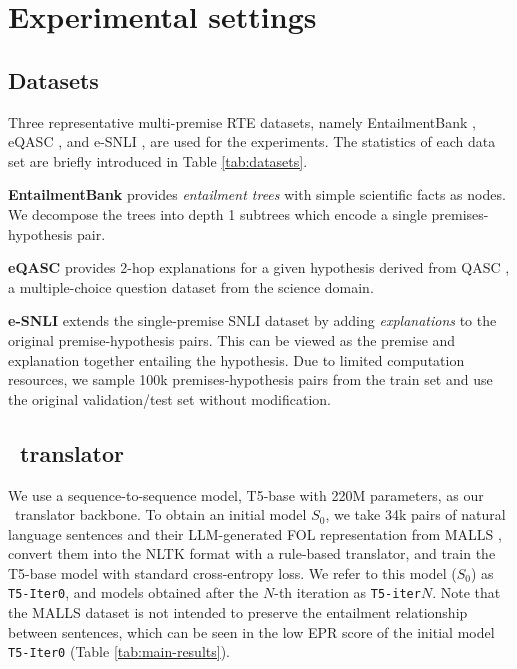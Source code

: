 \section{Experimental settings}
\subsection{Datasets}
\label{sec:datasets}



Three representative multi-premise RTE datasets, namely EntailmentBank \citep{entailmentbank}, eQASC \citep{eqasc}, and e-SNLI \citep{esnli}, are used for the experiments. The statistics of each data set are briefly introduced in Table \ref{tab:datasets}.

\textbf{EntailmentBank} provides \textit{entailment trees} with simple scientific facts as nodes. We decompose the trees into depth 1 subtrees which encode a single premises-hypothesis pair.

\textbf{eQASC} provides 2-hop explanations for a given hypothesis derived from QASC \citep{qasc}, a multiple-choice question dataset from the science domain.

\textbf{e-SNLI} extends the single-premise SNLI dataset \citep{snli} by adding \textit{explanations} to the original premise-hypothesis pairs. This can be viewed as the premise and explanation together entailing the hypothesis. Due to limited computation resources, we sample 100k premises-hypothesis pairs from the train set and use the original validation/test set without modification.

\subsection{\nltofol\ translator}

We use a sequence-to-sequence model, T5-base \citep{t5} with 220M parameters, as our \nltofol\ translator backbone. To obtain an initial model $S_0$, we take 34k pairs of natural language sentences and their LLM-generated FOL representation from MALLS \citep{malls},
convert them into the NLTK format \citep{nltk} with a rule-based translator, and train the T5-base model with standard cross-entropy loss. We refer to this model ($S_0$) as \texttt{T5-Iter0}, and models obtained after the $N$-th iteration as \texttt{T5-iter}$N$. Note that the MALLS dataset is not intended to preserve the entailment relationship between sentences, which can be seen in the low EPR score of the initial model \texttt{T5-Iter0} (Table \ref{tab:main-results}).

